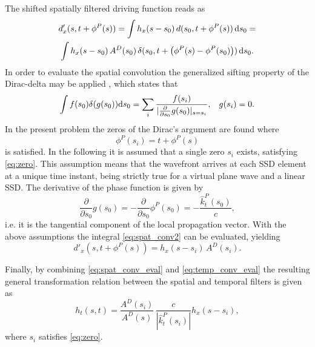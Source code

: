 \documentclass[conference]{IEEEtran}
\begin{document}
The shifted spatially filtered driving function reads as
\begin{multline}
    d'_x(s,t+ \phi^P(s) ) = \int h_x(s-s_0) \, d(s_0,t+ \phi^P(s) ) \, \td s_0 = \\
    \int h_x(s-s_0) \, A^D(s_0)\, \delta(s_0,t+ \left(\phi^P(s)-\phi^P(s_0)\right)  ) \, \td s_0.
    \label{eq:spat_conv2}
\end{multline}
In order to evaluate the spatial convolution the generalized sifting property of the Dirac-delta may be applied \cite{Firtha2019phd}, which states that
\begin{equation}
    \int f(s_0) \delta(g(s_0)) \mathrm{d} s_0 = \sum_i \frac{f(s_i)}{| \frac{\partial}{\partial s_0} g(s_0) |_{s = s_i}}, \hspace{3mm} g(s_i) = 0.
\end{equation}
In the present problem the zeros of the Dirac's argument are found where
\begin{equation}
    \phi^P(s_i) = t + \phi^P(s)
    \label{eq:zero}
\end{equation}
is satisfied.
In the following it is assumed that a single zero $s_i$ exists, satisfying \eqref{eq:zero}.
This assumption means that the wavefront arrives at each SSD element at a unique time instant, being strictly true for a virtual plane wave and a linear SSD.
The derivative of the phase function is given by
\begin{equation}
    \frac{\partial}{\partial s_0} g(s_0) = - \frac{\partial}{\partial s_0} \phi^P(s_0) = -\frac{\hat{k}_t^P(s_0)}{c},
\end{equation}
i.e. it is the tangential component of the local propagation vector.
With the above assumptions the integral \eqref{eq:spat_conv2} can be evaluated, yielding
\begin{equation}
    d'_x(s,t+ \phi^P(s) ) = h_x(s-s_i) \, A^D(s_i)
    .
    \label{eq:spat_conv_eval}
\end{equation}

Finally, by combining \eqref{eq:spat_conv_eval} and \eqref{eq:temp_conv_eval} the resulting general transformation relation between the spatial and temporal filters is given as
\begin{equation}
    h_t\left(s,t\right) = \frac{A^D(s_i)}{A^D(s)} \, \frac{ c }{|\hat{k}_t^P(s_i)|} h_x(s-s_i),
\end{equation}
where $s_i$ satisfies \eqref{eq:zero}.
\end{document}
